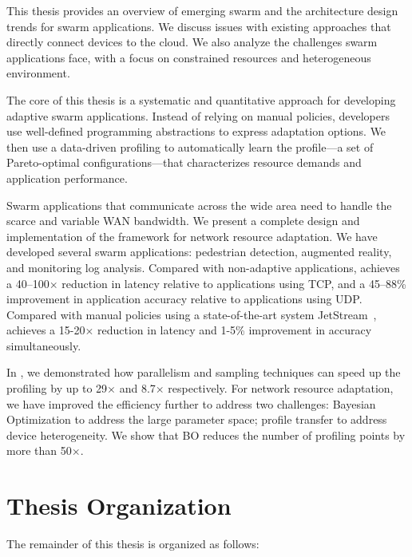 \documentclass[thesis.tex]{subfiles}
\begin{document}
 This thesis provides an overview of
emerging swarm and the architecture design trends for swarm applications. We
discuss issues with existing approaches that directly connect devices to the
cloud. We also analyze the challenges swarm applications face, with a focus on
constrained resources and heterogeneous environment.

 The core of this thesis is a
systematic and quantitative approach for developing adaptive swarm
applications. Instead of relying on manual policies, developers use well-defined
programming abstractions to express adaptation options. We then use a
data-driven profiling to automatically learn the profile---a set of
Pareto-optimal configurations---that characterizes resource demands and
application performance.

 Swarm applications
that communicate across the wide area need to handle the scarce and variable WAN
bandwidth. We present a complete design and implementation of the framework
\awstream{} for network resource adaptation. We have developed several swarm
applications: pedestrian detection, augmented reality, and monitoring log
analysis. Compared with non-adaptive applications, \awstream{} achieves a
40--100$\times$ reduction in latency relative to applications using TCP, and a
45--88\% improvement in application accuracy relative to applications using
UDP. Compared with manual policies using a state-of-the-art system
JetStream~\cite{rabkin2014aggregation}, \awstream{} achieves a 15-20$\times$
reduction in latency and 1-5\% improvement in accuracy simultaneously.

 In \awstream{}, we demonstrated how
parallelism and sampling techniques can speed up the profiling by up to
29$\times$ and 8.7$\times$ respectively. For network resource adaptation, we
have improved the efficiency further to address two challenges: Bayesian
Optimization to address the large parameter space; profile transfer to address
device heterogeneity. We show that BO reduces the number of profiling points by
more than 50$\times$.

\section{Thesis Organization}
\label{sec:thesis-organization}

The remainder of this thesis is organized as follows:
\end{document}
